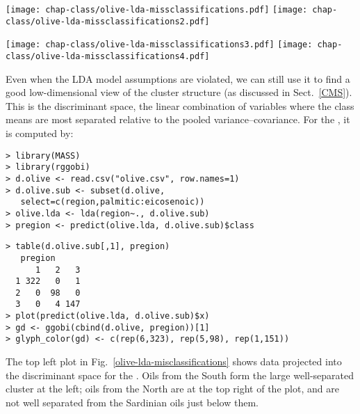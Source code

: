 \begin{figure*}[htb]
\centerline{
  {\texttt{[image: chap-class/olive-lda-missclassifications.pdf]}}
  {\texttt{[image: chap-class/olive-lda-missclassifications2.pdf]}}}
\smallskip
\centerline{
  {\texttt{[image: chap-class/olive-lda-missclassifications3.pdf]}}
  {\texttt{[image: chap-class/olive-lda-missclassifications4.pdf]}}}
\caption[Misclassifications from an LDA classifier of the .]{Misclassifications from an LDA classifier of the  by .  In the misclassification table {\bf (top
right)}, erroneously classified samples are brushed as large filled
circles, and studied in the discriminant space {\bf (top left)}, and
the 2D tour {\bf (bottom row)}.}
\label{olive-lda-misclassifications}
\end{figure*}

Even when the LDA model assumptions are violated, we can still use it
to find a good low-dimensional view of the cluster structure (as
discussed in Sect.~\ref{CMS}).  This is the discriminant space, the
linear combination of variables where the class means are most
separated relative to the pooled variance--covariance.  For the
, it is computed by:

\begin{verbatim}
> library(MASS)
> library(rggobi)
> d.olive <- read.csv("olive.csv", row.names=1)
> d.olive.sub <- subset(d.olive,
   select=c(region,palmitic:eicosenoic))
> olive.lda <- lda(region~., d.olive.sub)
> pregion <- predict(olive.lda, d.olive.sub)$class
\end{verbatim}
\newpage  %
\begin{verbatim}
> table(d.olive.sub[,1], pregion)
   pregion
      1   2   3
  1 322   0   1
  2   0  98   0
  3   0   4 147
> plot(predict(olive.lda, d.olive.sub)$x)
> gd <- ggobi(cbind(d.olive, pregion))[1]
> glyph_color(gd) <- c(rep(6,323), rep(5,98), rep(1,151))
\end{verbatim}

\noindent The top left plot in Fig.~\ref{olive-lda-misclassifications} 
shows data projected into the discriminant space for the .  Oils from the South form the large well-separated cluster at
the left; oils from the North are at the top right of the plot, and
are not well separated from the Sardinian oils just below them.

